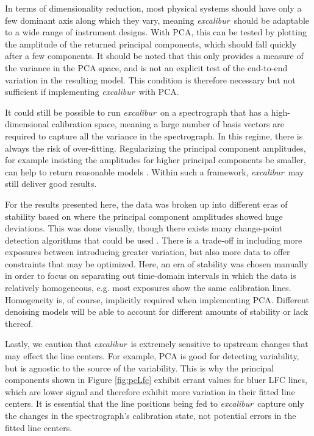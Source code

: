 \documentclass[twocolumn,table,xcolor,trackchanges]{aastex63}
\newcommand{\project}[1]{\textsl{#1}}
\newcommand{\name}{\project{excalibur}}
\begin{document}
In terms of dimensionality reduction, most physical systems should have only a few dominant axis along which they vary, meaning \name\ should be adaptable to a wide range of instrument designs.  With PCA, this can be tested by plotting the amplitude of the returned principal components, which should fall quickly after a few components.  It should be noted that this only provides a measure of the variance in the PCA space, and is not an explicit test of the end-to-end variation in the resulting model.  This condition is therefore necessary but not sufficient if implementing \name\ with PCA.

It could still be possible to run \name\ on a spectrograph that has a high-dimensional calibration space, meaning a large number of basis vectors are required to capture all the variance in the spectrograph.  In this regime, there is always the risk of over-fitting.  Regularizing the principal component amplitudes, for example insisting the amplitudes for higher principal components be smaller, can help to return reasonable models \citep{formanmackey2015} .  Within such a framework, \name\ may still deliver good results.

For the results presented here, the data was broken up into different eras of stability based on where the principal component amplitudes showed huge deviations.  This was done visually, though there exists many change-point detection algorithms that could be used \citep{aminikhanghahi2017}.  There is a trade-off in including more exposures between introducing greater variation, but also more data to offer constraints that may be optimized.  Here, an era of stability was chosen  manually in order to focus on separating out time-domain intervals in which the data is relatively homogeneous, e.g. most exposures show the same calibration lines.  Homogeneity is, of course, implicitly required when implementing PCA.  Different denoising models will be able to account for different amounts of stability or lack thereof.

Lastly, we caution that \name\ is extremely sensitive to upstream changes that may effect the line centers.  For example, PCA is good for detecting variability, but is agnostic to the source of the variability.  This is why the principal components shown in Figure \ref{fig:pcLfc} exhibit errant values for bluer LFC lines, which are lower signal and therefore exhibit more variation in their fitted line centers.  It is essential that the line positions being fed to \name\ capture only the changes in the spectrograph's calibration state, not potential errors in the fitted line centers. 
\end{document}
